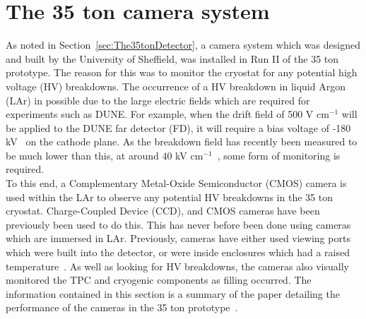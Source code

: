 
\chapter{The 35 ton camera system} \label{chap:Cameras} %



\graphicspath{{The35tonCameras/Figs/Raster/}{The35tonCameras/Figs/PDF/}{The35tonCameras/Figs/Vector/}}

As noted in Section~\ref{sec:The35tonDetector}, a camera system which was designed and built by the University of Sheffield, was installed in Run II of the 35 ton prototype. The reason for this was to monitor the cryostat for any potential high voltage (HV) breakdowns. The occurrence of a HV breakdown in liquid Argon (LAr) in possible due to the large electric fields which are required for experiments such as DUNE. For example, when the drift field of 500 V cm$^{-1}$ will be applied to the DUNE far detector (FD), it will require a bias voltage of -180 kV~\citep{DUNECDR_V4} on the cathode plane. As the breakdown field has recently been measured to be much lower than this, at around 40 kV cm$^{-1}$~\citep{BlatterEField}, some form of monitoring is required. \\

To this end, a Complementary Metal-Oxide Semiconductor (CMOS) camera is used within the LAr to observe any potential HV breakdowns in the 35 ton cryostat. Charge-Coupled Device (CCD), and CMOS cameras have been previously been used to do this. This has never before been done using cameras which are immersed in LAr. Previously, cameras have either used viewing ports which were built into the detector, or were inside enclosures which had a raised temperature~\citep{BlatterEField,BERNcam,LAPD,Liverpool,Weizmannbubbles}. As well as looking for HV breakdowns, the cameras also visually monitored the TPC and cryogenic components as filling occurred. The information contained in this section is a summary of the paper detailing the performance of the cameras in the 35 ton prototype~\citep{CameraPaper}. \\

